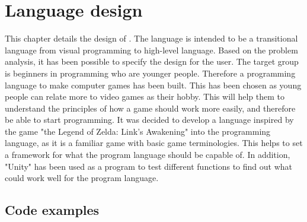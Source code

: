\chapter{Language design}
This chapter details the design of \dazel.
The language is intended to be a transitional language from visual programming to high-level language. Based on the problem analysis, it has been possible to specify the design for the user.
The target group is beginners in programming who are younger people. Therefore a programming language to make computer games has been built. This has been chosen as young people can relate more to video games as their hobby. 
This will help them to understand the principles of how a game should work more easily, and therefore be able to start programming. 
It was decided to develop a language inspired by the game "the Legend of Zelda: Link’s Awakening" into the programming language, as it is a familiar game with basic game terminologies.
This helps to set a framework for what the program language should be capable of.
In addition, "Unity" has been used as a program to test different functions to find out what could work well for the program language.



\section{Code examples}

